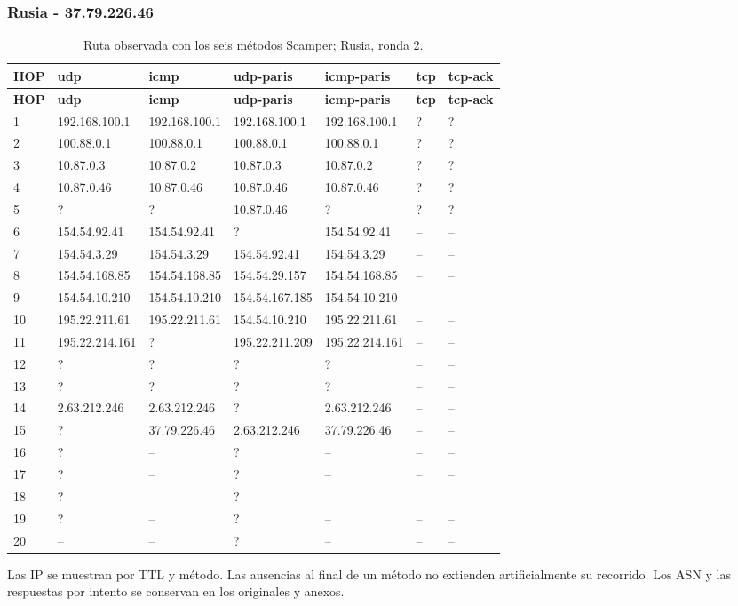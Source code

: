 \begin{landscape}
\subsubsection{Rusia - 37.79.226.46}
\begingroup
\fontsize{9}{11}\selectfont
\begin{longtable}{p{0.95cm}p{3.725cm}p{3.725cm}p{3.725cm}p{3.725cm}p{3.725cm}p{3.725cm}}
\caption{Ruta observada con los seis métodos Scamper; Rusia, ronda 2.}\label{tabla1:37.79.226.46} \\
\toprule
\textbf{HOP} & \textbf{udp} & \textbf{icmp} & \textbf{udp-paris} & \textbf{icmp-paris} & \textbf{tcp} & \textbf{tcp-ack} \\ \midrule
\endfirsthead
\toprule
\textbf{HOP} & \textbf{udp} & \textbf{icmp} & \textbf{udp-paris} & \textbf{icmp-paris} & \textbf{tcp} & \textbf{tcp-ack} \\ \midrule
\endhead
1 & 192.168.100.1 & 192.168.100.1 & 192.168.100.1 & 192.168.100.1 & ? & ? \\
2 & 100.88.0.1 & 100.88.0.1 & 100.88.0.1 & 100.88.0.1 & ? & ? \\
3 & 10.87.0.3 & 10.87.0.2 & 10.87.0.3 & 10.87.0.2 & ? & ? \\
4 & 10.87.0.46 & 10.87.0.46 & 10.87.0.46 & 10.87.0.46 & ? & ? \\
5 & ? & ? & 10.87.0.46 & ? & ? & ? \\
6 & 154.54.92.41 & 154.54.92.41 & ? & 154.54.92.41 & -- & -- \\
7 & 154.54.3.29 & 154.54.3.29 & 154.54.92.41 & 154.54.3.29 & -- & -- \\
8 & 154.54.168.85 & 154.54.168.85 & 154.54.29.157 & 154.54.168.85 & -- & -- \\
9 & 154.54.10.210 & 154.54.10.210 & 154.54.167.185 & 154.54.10.210 & -- & -- \\
10 & 195.22.211.61 & 195.22.211.61 & 154.54.10.210 & 195.22.211.61 & -- & -- \\
11 & 195.22.214.161 & ? & 195.22.211.209 & 195.22.214.161 & -- & -- \\
12 & ? & ? & ? & ? & -- & -- \\
13 & ? & ? & ? & ? & -- & -- \\
14 & 2.63.212.246 & 2.63.212.246 & ? & 2.63.212.246 & -- & -- \\
15 & ? & 37.79.226.46 & 2.63.212.246 & 37.79.226.46 & -- & -- \\
16 & ? & -- & ? & -- & -- & -- \\
17 & ? & -- & ? & -- & -- & -- \\
18 & ? & -- & ? & -- & -- & -- \\
19 & ? & -- & ? & -- & -- & -- \\
20 & -- & -- & ? & -- & -- & -- \\
\bottomrule
\end{longtable}
\endgroup
Las IP se muestran por TTL y método. Las ausencias al final de un método no extienden artificialmente su recorrido. Los ASN y las respuestas por intento se conservan en los originales y anexos.

\end{landscape}
